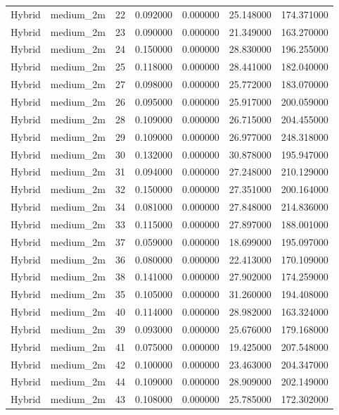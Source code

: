 \begin{tabular}{llrrrrr}
Hybrid & medium_2m & 22 & 0.092000 & 0.000000 & 25.148000 & 174.371000 \\
Hybrid & medium_2m & 23 & 0.090000 & 0.000000 & 21.349000 & 163.270000 \\
Hybrid & medium_2m & 24 & 0.150000 & 0.000000 & 28.830000 & 196.255000 \\
Hybrid & medium_2m & 25 & 0.118000 & 0.000000 & 28.441000 & 182.040000 \\
Hybrid & medium_2m & 27 & 0.098000 & 0.000000 & 25.772000 & 183.070000 \\
Hybrid & medium_2m & 26 & 0.095000 & 0.000000 & 25.917000 & 200.059000 \\
Hybrid & medium_2m & 28 & 0.109000 & 0.000000 & 26.715000 & 204.455000 \\
Hybrid & medium_2m & 29 & 0.109000 & 0.000000 & 26.977000 & 248.318000 \\
Hybrid & medium_2m & 30 & 0.132000 & 0.000000 & 30.878000 & 195.947000 \\
Hybrid & medium_2m & 31 & 0.094000 & 0.000000 & 27.248000 & 210.129000 \\
Hybrid & medium_2m & 32 & 0.150000 & 0.000000 & 27.351000 & 200.164000 \\
Hybrid & medium_2m & 34 & 0.081000 & 0.000000 & 27.848000 & 214.836000 \\
Hybrid & medium_2m & 33 & 0.115000 & 0.000000 & 27.897000 & 188.001000 \\
Hybrid & medium_2m & 37 & 0.059000 & 0.000000 & 18.699000 & 195.097000 \\
Hybrid & medium_2m & 36 & 0.080000 & 0.000000 & 22.413000 & 170.109000 \\
Hybrid & medium_2m & 38 & 0.141000 & 0.000000 & 27.902000 & 174.259000 \\
Hybrid & medium_2m & 35 & 0.105000 & 0.000000 & 31.260000 & 194.408000 \\
Hybrid & medium_2m & 40 & 0.114000 & 0.000000 & 28.982000 & 163.324000 \\
Hybrid & medium_2m & 39 & 0.093000 & 0.000000 & 25.676000 & 179.168000 \\
Hybrid & medium_2m & 41 & 0.075000 & 0.000000 & 19.425000 & 207.548000 \\
Hybrid & medium_2m & 42 & 0.100000 & 0.000000 & 23.463000 & 204.347000 \\
Hybrid & medium_2m & 44 & 0.109000 & 0.000000 & 28.909000 & 202.149000 \\
Hybrid & medium_2m & 43 & 0.108000 & 0.000000 & 25.785000 & 172.302000 \\

\end{tabular}
